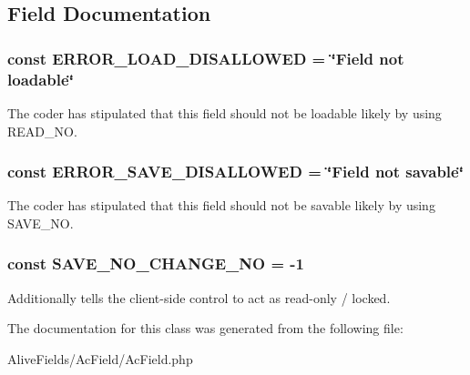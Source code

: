 \subsection{\-Field \-Documentation}
\hypertarget{class_ac_field_adbff611f2736d3c98246ca6f281b38d5}{
\subsubsection[{\-E\-R\-R\-O\-R\-\_\-\-L\-O\-A\-D\-\_\-\-D\-I\-S\-A\-L\-L\-O\-W\-E\-D}]{\setlength{\rightskip}{0pt plus 5cm}const {\bf \-E\-R\-R\-O\-R\-\_\-\-L\-O\-A\-D\-\_\-\-D\-I\-S\-A\-L\-L\-O\-W\-E\-D} = \char`\"{}\-Field not loadable\char`\"{}}}\label{class_ac_field_adbff611f2736d3c98246ca6f281b38d5}
\-The coder has stipulated that this field should not be loadable likely by using \-R\-E\-A\-D\-\_\-\-N\-O. \hypertarget{class_ac_field_a558a9054a2279ebccbe00f2436842369}{
\subsubsection[{\-E\-R\-R\-O\-R\-\_\-\-S\-A\-V\-E\-\_\-\-D\-I\-S\-A\-L\-L\-O\-W\-E\-D}]{\setlength{\rightskip}{0pt plus 5cm}const {\bf \-E\-R\-R\-O\-R\-\_\-\-S\-A\-V\-E\-\_\-\-D\-I\-S\-A\-L\-L\-O\-W\-E\-D} = \char`\"{}\-Field not savable\char`\"{}}}\label{class_ac_field_a558a9054a2279ebccbe00f2436842369}
\-The coder has stipulated that this field should not be savable likely by using \-S\-A\-V\-E\-\_\-\-N\-O. \hypertarget{class_ac_field_af4bf3faa0b703eca1f81a94ca49f9fd1}{
\subsubsection[{\-S\-A\-V\-E\-\_\-\-N\-O\-\_\-\-C\-H\-A\-N\-G\-E\-\_\-\-N\-O}]{\setlength{\rightskip}{0pt plus 5cm}const {\bf \-S\-A\-V\-E\-\_\-\-N\-O\-\_\-\-C\-H\-A\-N\-G\-E\-\_\-\-N\-O} = -\/1}}\label{class_ac_field_af4bf3faa0b703eca1f81a94ca49f9fd1}
\-Additionally tells the client-\/side control to act as read-\/only / locked. 

\-The documentation for this class was generated from the following file\-:\begin{DoxyCompactItemize}
\item 
\-Alive\-Fields/\-Ac\-Field/\-Ac\-Field.\-php\end{DoxyCompactItemize}
